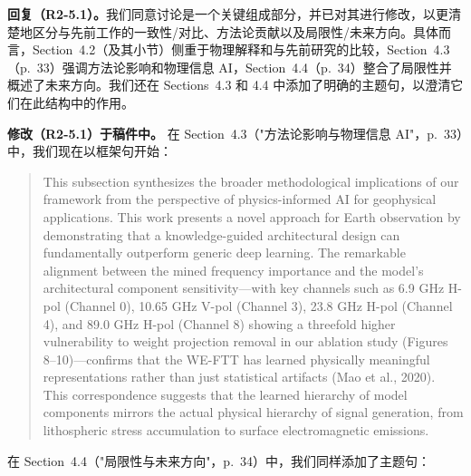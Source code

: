 \documentclass[12pt]{article}
\newcommand{\revresponse}[1]{\begingroup\color{responsecolor}#1\endgroup}
\newcommand{\revchange}[1]{\begingroup\color{changecolor}#1\endgroup}
\begin{document}
\revresponse{%
\textbf{回复（R2-5.1）。}我们同意讨论是一个关键组成部分，并已对其进行修改，以更清楚地区分与先前工作的一致性/对比、方法论贡献以及局限性/未来方向。具体而言，Section~4.2（及其小节）侧重于物理解释和与先前研究的比较，Section~4.3（p.~33）强调方法论影响和物理信息 AI，Section~4.4（p.~34）整合了局限性并概述了未来方向。我们还在 Sections~4.3 和 4.4 中添加了明确的主题句，以澄清它们在此结构中的作用。
}

\revchange{%
\textbf{修改（R2-5.1）于稿件中。}
在 Section~4.3（"方法论影响与物理信息 AI"，p.~33）中，我们现在以框架句开始：

\begin{quote}
This subsection synthesizes the broader methodological implications of our framework from the perspective of physics-informed AI for geophysical applications. This work presents a novel approach for Earth observation by demonstrating that a knowledge-guided architectural design can fundamentally outperform generic deep learning. The remarkable alignment between the mined frequency importance and the model's architectural component sensitivity---with key channels such as 6.9 GHz H-pol (Channel 0), 10.65 GHz V-pol (Channel 3), 23.8 GHz H-pol (Channel 4), and 89.0 GHz H-pol (Channel 8) showing a threefold higher vulnerability to weight projection removal in our ablation study (Figures 8--10)---confirms that the WE-FTT has learned physically meaningful representations rather than just statistical artifacts (Mao et al., 2020). This correspondence suggests that the learned hierarchy of model components mirrors the actual physical hierarchy of signal generation, from lithospheric stress accumulation to surface electromagnetic emissions.
\end{quote}

在 Section~4.4（"局限性与未来方向"，p.~34）中，我们同样添加了主题句：

}
\end{document}
